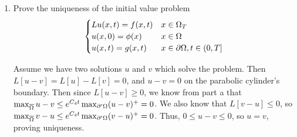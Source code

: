 \begin{enumerate}
\item
  Prove the uniqueness of the initial value problem
  $$
  \begin{cases}
    L u(x, t) = f(x, t) & x \in \Omega_T\\
    u(x, 0) = \phi(x) & x \in \Omega\\
    u(x, t) = g(x, t) & x \in \partial \Omega, t \in (0, T]
  \end{cases}
  $$

  Assume we have two solutions $u$ and $v$ which solve the problem.
  Then $L[u - v] = L[u] - L[v] = 0$, and $u - v = 0$ on the parabolic cylinder's boundary.
  Then since $L[u - v] \geq 0$, we know from part a that $\max_{\overline{\Omega}}u - v \leq e^{C_4 t} \max_{\partial ' \Omega} (u - v)^+ = 0$.
  We also know that $L[v - u] \leq 0$, so $\max_{\overline{\Omega}}v - u \leq e^{C_4 t} \max_{\partial ' \Omega} (v - u)^+ = 0$.
  Thus, $0 \leq u - v \leq 0$, so $u = v$, proving uniqueness.
\end{enumerate}
